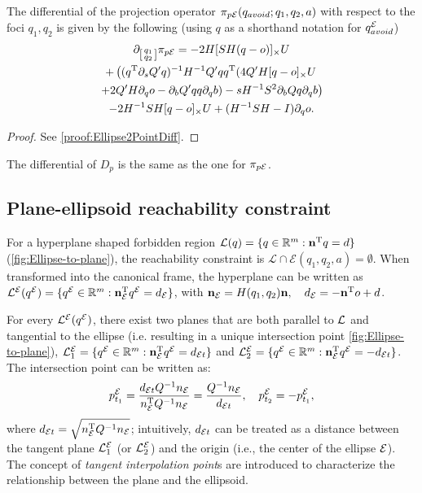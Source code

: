 \documentclass[10pt,twocolumn,twoside]{IEEEtran}
\begin{document}
  \begin{proposition}\label{prop:Ellipse2PointDiff}
    The differential of the projection operator $\pi_{p\mathcal{E}}(q_{avoid}; q_1,q_2,a)$ with respect to the foci $q_1,q_2$ is given by the following (using $q$ as a shorthand notation for $q^{\mathcal{E}}_{avoid}$)
    \begin{multline}
      \partial_{\left[\begin{smallmatrix}q_1\\q_2\end{smallmatrix}\right]} \pi_{p\mathcal{E}}=-2 H [ SH(q-o)]_{\times}U   \\
      + \left( (q^\mathrm{T} \partial_sQ' q)^{-1} H^{-1} Q' q q^\mathrm{T}  (4Q' H[q - o]_\times U \right. \\
      \left.+ 2Q' H\partial_q o - \partial_b Q' q q \partial_q b) -  s H^{-1} S^2 \partial_b Q q \partial_q b\right) \\
      -2H^{-1} S H[q-o]_{\times} U  + (H^{-1}SH -I)\partial_q o.
    \end{multline}
  \end{proposition}
  \begin{proof}
  See \cref{proof:Ellipse2PointDiff}.
  \end{proof}
  The differential of $D_p$ is the same as the one for $\pi_{p\mathcal{E}}$.

\subsection{Plane-ellipsoid reachability constraint}\label{sec:ellipsoide-plane}

For a hyperplane shaped forbidden region $\mathcal{L}(q) = \{q\in\mathbb{R}^m: \mathbf{n}^\mathrm{T} q = d\}$ (\cref{fig:Ellipse-to-plane}), the reachability constraint is $\mathcal{L} \cap \mathcal{E}(q_1,q_2,a) = \emptyset$. When transformed into the canonical frame, the hyperplane can be written as ${\mathcal{L}^{\mathcal{E}}}({q^{\mathcal{E}}}) = \{  {q^{\mathcal{E}}}\in\mathbb{R}^m:  \mathbf{n}_{\mathcal{E}}^\mathrm{T} {q^{\mathcal{E}}} = d_{\mathcal{E}}\}$, with $\mathbf{n}_{\mathcal{E}} = H(q_1,q_2)\mathbf{n}, \quad d_{\mathcal{E}} =-\mathbf{n}^\mathrm{T} o + d$.

For every ${\mathcal{L}^{\mathcal{E}}}({q^{\mathcal{E}}})$, there exist two planes that are both parallel to $\mathcal{L}$ and tangential to the ellipse (i.e. resulting in a unique intersection point \cref{fig:Ellipse-to-plane}), $\mathcal{L}_1^{\mathcal{E}} = \{{q^{\mathcal{E}}}\in\mathbb{R}^m: \mathbf{n}_{\mathcal{E}} ^\mathrm{T} {q^{\mathcal{E}}} =  d_{\mathcal{E} t} \}$ and $\mathcal{L}_2^{\mathcal{E}} = \{{q^{\mathcal{E}}}\in\mathbb{R}^m: \mathbf{n}_{\mathcal{E}} ^\mathrm{T} {q^{\mathcal{E}}} = - d_{\mathcal{E} t} \}$. The intersection point can be written as:
\begin{equation}
    p^{\mathcal{E}}_{t_{1}} = \frac{ d_{\mathcal{E} t} Q^{-1}   n_{\mathcal{E}}}{ n_{\mathcal{E}} ^\mathrm{T} Q^{-1}  n_{\mathcal{E}}} = \frac{Q^{-1} n_{\mathcal{E}}}{ d_{\mathcal{E} t}},\quad  p^{\mathcal{E}}_{t_{2}} = -  p^{\mathcal{E}}_{t_{1}},
\end{equation}
where $d_{\mathcal{E} t} = \sqrt{ n_{\mathcal{E}}^\mathrm{T} Q^{-1} n_{\mathcal{E}}}$; intuitively, $d_{\mathcal{E} t}$ can be treated as a distance between the tangent plane $\mathcal{L}_1^{\mathcal{E}}$ (or $\mathcal{L}_2^{\mathcal{E}}$) and the origin (i.e., the center of the ellipse $\mathcal{E}$). The concept of \emph{tangent interpolation point}s are introduced to characterize the relationship between the plane and the ellipsoid.
\end{document}
